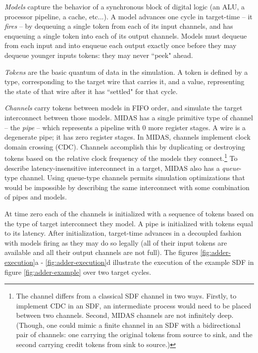 \emph{Models} capture the behavior of a synchronous block of digital logic (an
ALU, a processor pipeline, a cache, etc...). A model advances one cycle in
target-time -- it \emph{fires} -- by dequeuing a single token from each of its
input channels, and has enqueuing a single token into each of its output
channels.  Models must dequeue from each input and into enqueue each output
exactly once before they may dequeue younger inputs tokens: they may never
``peek" ahead.

\emph{Tokens} are the basic quantum of data in the simulation. A token is
defined by a type, corresponding to the target wire that carries it, and a
value, representing the state of that wire after it has ``settled" for that
cycle.

\emph{Channels} carry tokens between models in FIFO order, and simulate the
target interconnect between those models. MIDAS has a single primitive type of
channel --  the \emph{pipe} -- which represents a pipeline with 0 more register
stages. A wire is a degenerate pipe; it has zero register stages. In MIDAS,
channels implement clock domain crossing (CDC).  Channels accomplish this by
duplicating or destroying tokens based on the relative clock frequency of the
models they connect.\footnote{The channel differs from a classical SDF channel
in two ways.  Firstly, to implement CDC in an SDF, an intermediate process
would need to be placed between two channels. Second, MIDAS channels are not
infinitely deep.  (Though, one could mimic a finite channel in an SDF with a
bidirectional pair of channels: one carrying the original tokens from source to
sink, and the second carrying credit tokens from sink to source.)} To describe
latency-insensitive interconnect in a target, MIDAS also has a
\emph{queue}-type channel. Using queue-type channels permits simulation
optimizations that would be impossible by describing the same interconnect with
some combination of pipes and models.

At time zero each of the channels is initialized with a sequence of tokens based
on the type of target interconnect they model. A pipe is initialized with tokens
equal to its latency. After initialization, target-time advances in a decoupled
fashion with models firing as they may do so legally (all of their input tokens
are available and all their output channels are not full). The figures
\ref{fig:adder-execution}a - \ref{fig:adder-execution}d illustrate the
execution of the example SDF in figure \ref{fig:adder-example} over two target
cycles.

